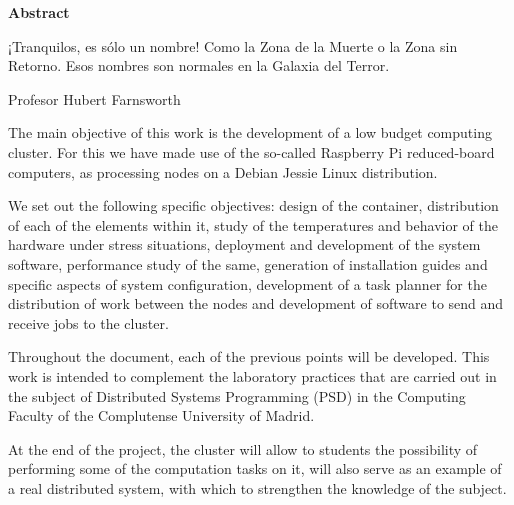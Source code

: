 \newpage
\begin{flushleft}
{\bf \Huge Abstract}
\end{flushleft}
\vspace{1cm}
\setlength{\baselineskip}{0.8cm}

\begin{FraseCelebre}
	\begin{Frase}
		¡Tranquilos, es sólo un nombre! Como la Zona de la Muerte o la Zona sin Retorno. Esos nombres son normales en la Galaxia del Terror.
	\end{Frase}
	\begin{Fuente}
	Profesor Hubert Farnsworth
	\end{Fuente}
\end{FraseCelebre}

The main objective of this work is the development of a low budget computing cluster. For this we have made use of the so-called Raspberry Pi reduced-board computers, as processing nodes on a Debian Jessie Linux distribution.


We set out the following specific objectives: design of the container, distribution of each of the elements within it, study of the temperatures and behavior of the hardware under stress situations, deployment and development of the system software, performance study of the same, generation of installation guides and specific aspects of system configuration, development of a task planner for the distribution of work between the nodes and development of software to send and receive jobs to the cluster.

Throughout the document, each of the previous points will be developed. This work is intended to complement the laboratory practices that are carried out in the subject of Distributed Systems Programming (PSD) in the Computing Faculty of the Complutense University of Madrid. 

At the end of the project, the cluster will allow to students the possibility of performing some of the computation tasks on it, will also serve as an example of a real distributed system, with which to strengthen the knowledge of the subject.

